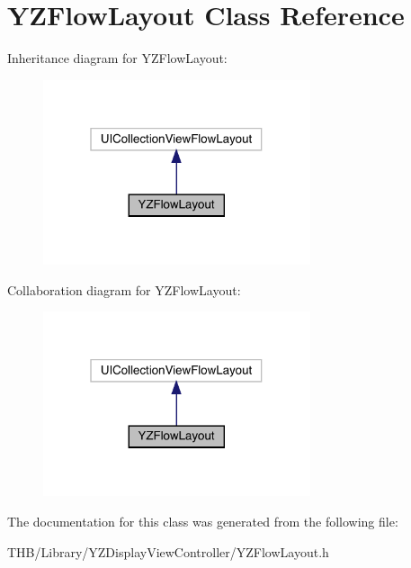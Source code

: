 \hypertarget{interface_y_z_flow_layout}{}\section{Y\+Z\+Flow\+Layout Class Reference}
\label{interface_y_z_flow_layout}


Inheritance diagram for Y\+Z\+Flow\+Layout\+:\nopagebreak
\begin{figure}[H]
\begin{center}
\leavevmode
\includegraphics[width=223pt]{interface_y_z_flow_layout__inherit__graph}
\end{center}
\end{figure}


Collaboration diagram for Y\+Z\+Flow\+Layout\+:\nopagebreak
\begin{figure}[H]
\begin{center}
\leavevmode
\includegraphics[width=223pt]{interface_y_z_flow_layout__coll__graph}
\end{center}
\end{figure}


The documentation for this class was generated from the following file\+:\begin{DoxyCompactItemize}
\item 
T\+H\+B/\+Library/\+Y\+Z\+Display\+View\+Controller/Y\+Z\+Flow\+Layout.\+h\end{DoxyCompactItemize}
